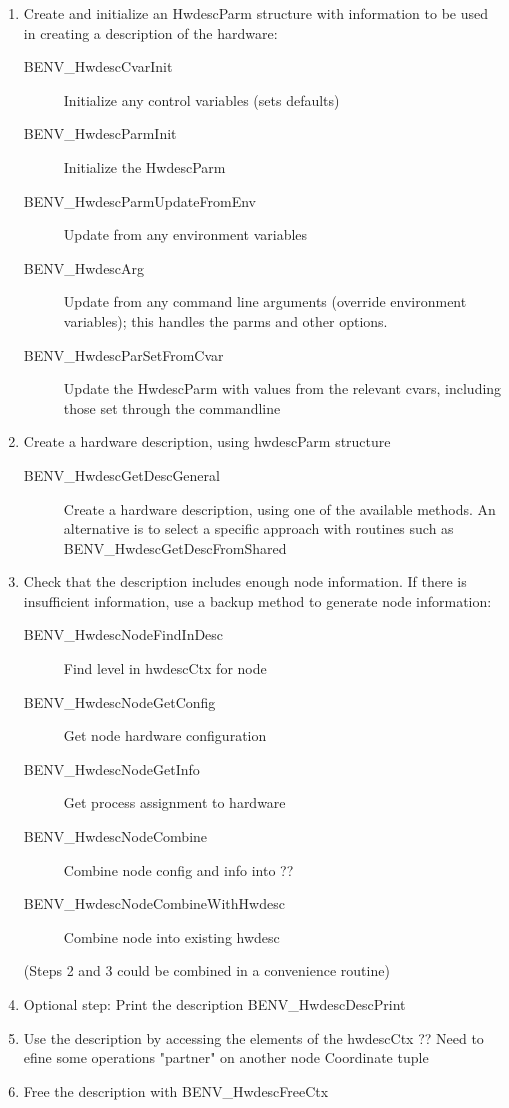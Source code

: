 \documentclass[11pt,letterpaper]{report}
\begin{document}
\begin{enumerate}
\item  Create and initialize an HwdescParm structure with information
  to be used in creating a description of the hardware:
\begin{description}
\item[BENV\_HwdescCvarInit]Initialize any control variables (sets defaults)
\item[BENV\_HwdescParmInit]Initialize the HwdescParm
\item[BENV\_HwdescParmUpdateFromEnv]Update from any environment variables
\item[BENV\_HwdescArg]Update from any command line arguments (override
       		      environment variables); this handles the parms and other
		      options.
\item[BENV\_HwdescParSetFromCvar]Update the HwdescParm with values
  from the relevant cvars, including those set through the commandline
\end{description}
\item Create a hardware description, using hwdescParm structure
\begin{description}
\item[BENV\_HwdescGetDescGeneral]Create a hardware description, using one
       of the available methods.
       An alternative is to select a specific approach with routines such as
       BENV\_HwdescGetDescFromShared
\end{description}
\item  Check that the description includes enough node information. If there
       is insufficient information, use a backup method to generate node
       information:
\begin{description}
\item[BENV\_HwdescNodeFindInDesc]Find level in hwdescCtx for node
\item[BENV\_HwdescNodeGetConfig]Get node hardware configuration
\item[BENV\_HwdescNodeGetInfo]Get process assignment to hardware
\item[BENV\_HwdescNodeCombine]Combine node config and info into ??
\item[BENV\_HwdescNodeCombineWithHwdesc]Combine node into existing
       hwdesc
\end{description}
       (Steps 2 and 3 could be combined in a convenience routine)
\item  Optional step: Print the description
       BENV\_HwdescDescPrint
\item  Use the description by accessing the elements of the hwdescCtx
       ?? Need to efine some operations
       	  "partner" on another node
	  Coordinate tuple
\item  Free the description with BENV\_HwdescFreeCtx
\end{enumerate}
\end{document}
